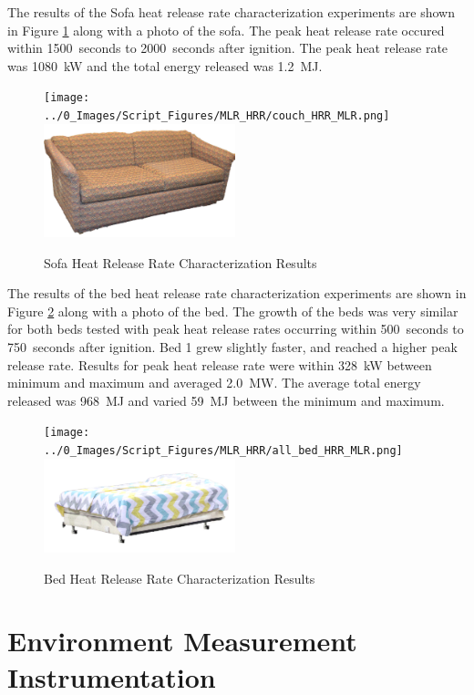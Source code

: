 \documentclass[12pt,oneside]{book}
\begin{document}
The results of the Sofa heat release rate characterization experiments are shown in Figure \ref{fig:sofa_HRR} along with a photo of the sofa. The peak heat release rate occured within 1500~seconds to 2000~seconds after ignition. The peak heat release rate was 1080~kW and the total energy released was 1.2~MJ. 

\begin{figure}[H]
	\centering
	\texttt{[image: ../0\_Images/Script\_Figures/MLR\_HRR/couch\_HRR\_MLR.png]}
	\includegraphics[width=0.495\textwidth]{../0_Images/Fuel/Sofa.jpg}
	\caption{Sofa Heat Release Rate Characterization Results}
	\label{fig:sofa_HRR}
\end{figure}

The results of the bed heat release rate characterization experiments are shown in Figure \ref{fig:bed_HRR} along with a photo of the bed. The growth of the beds was very similar for both beds tested with peak heat release rates occurring within 500~seconds to 750~seconds after ignition. Bed 1 grew slightly faster, and reached a higher peak release rate. Results for peak heat release rate were within 328~kW between minimum and maximum and averaged 2.0~MW. The average total energy released was 968~MJ and varied 59~MJ between the minimum and maximum. 

\begin{figure}[H]
	\centering
	\texttt{[image: ../0\_Images/Script\_Figures/MLR\_HRR/all\_bed\_HRR\_MLR.png]}
	\includegraphics[width=0.495\textwidth]{../0_Images/Fuel/Bed.png}
	\caption{Bed Heat Release Rate Characterization Results}
	\label{fig:bed_HRR}
\end{figure}

\clearpage

\section{Environment Measurement Instrumentation}
\end{document}
